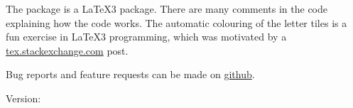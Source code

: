 \documentclass[svgnames]{report}
\begin{document}
  The  package is a \LaTeX3 package. There are many
  comments in the code explaining how the code works. The automatic
  colouring of the letter tiles is a fun exercise in \LaTeX3
  programming, which was motivated by a
  \href{https://tex.stackexchange.com/questions/659860/wordle-like-colored-letter-boxes-in-latex/660056#660056}{tex.stackexchange.com} post.

  Bug reports and feature requests can be made on \href{https://github.com/AndrewMathas/Wordle}{github}.

  \makeatletter
  Version: \wordle@version
  \makeatother

  \printindex
\end{document}
